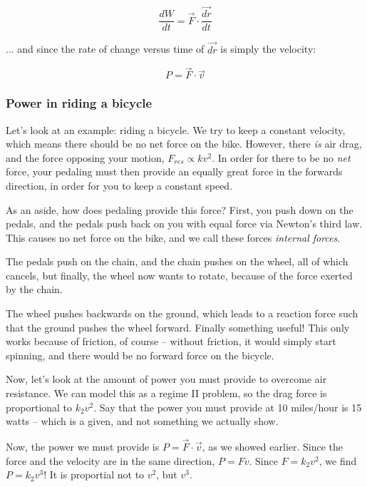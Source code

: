 \documentclass[12pt,a4paper]{report}
\begin{document}
\begin{equation}
\frac{dW}{dt} = \vec{F} \cdot \frac{\vec{dr}}{dt}
\end{equation}

... and since the rate of change versus time of $\vec{dr}$ is simply the velocity:

\begin{equation}
P = \vec{F} \cdot \vec{v}
\end{equation}

\subsubsection{Power in riding a bicycle}

Let's look at an example: riding a bicycle. We try to keep a constant velocity, which means there should be no net force on the bike. However, there \emph{is} air drag, and the force opposing your motion, $F_{res} \propto k v^2$. In order for there to be no \emph{net} force, your pedaling must then provide an equally great force in the forwards direction, in order for you to keep a constant speed.

As an aside, how does pedaling provide this force? First, you push down on the pedals, and the pedals push back on you with equal force via Newton's third law. This causes no net force on the bike, and we call these forces \emph{internal forces}.

The pedals push on the chain, and the chain pushes on the wheel, all of which cancels, but finally, the wheel now wants to rotate, because of the force exerted by the chain.

The wheel pushes backwards on the ground, which leads to a reaction force such that the ground pushes the wheel forward. Finally something useful! This only works because of friction, of course -- without friction, it would simply start spinning, and there would be no forward force on the bicycle.

Now, let's look at the amount of power you must provide to overcome air resistance. We can model this as a regime II problem, so the drag force is proportional to $k_2 v^2$. Say that the power you must provide at 10 miles/hour is 15 watts -- which is a given, and not something we actually show.

Now, the power we must provide is $P = \vec{F} \cdot \vec{v}$, as we showed earlier. Since the force and the velocity are in the same direction, $P = F v$. Since $F = k_2 v^2$, we find $P = k_2 v^3$! It is proportial not to $v^2$, but $v^3$.
\end{document}
